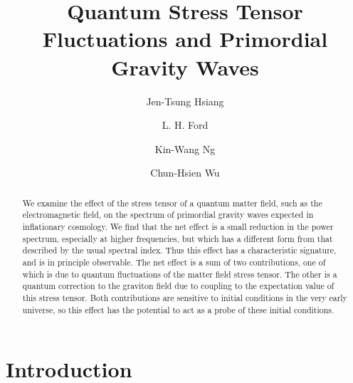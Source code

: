 \documentclass[preprint,prd,showpacs,superscriptaddress]{revtex4}
\begin{document}
\title{Quantum Stress Tensor Fluctuations and Primordial Gravity Waves}


\author{Jen-Tsung Hsiang}
\author{L. H. Ford}
\author{Kin-Wang Ng}
\author{Chun-Hsien Wu}

\begin{abstract}
We examine the effect of the stress tensor of a quantum matter field, such as the electromagnetic field, on
the spectrum of primordial gravity waves expected in inflationary cosmology. We find that the net effect is
a small reduction in the power spectrum, especially at higher frequencies, but which has a different form
from that described by the usual spectral index. Thus this effect has a characteristic signature, and is in
principle observable. The net effect is a sum of two contributions, one of which is due to quantum fluctuations
of the matter field stress tensor. The other is a quantum correction to the graviton field due to coupling to
the expectation value of this stress tensor. Both contributions are sensitive to initial conditions in the very
early universe, so this effect has the potential to act as a probe of these initial conditions.
\end{abstract}


\maketitle

\baselineskip=16pt

\section{Introduction}
\label{sec:intro}
\end{document}
